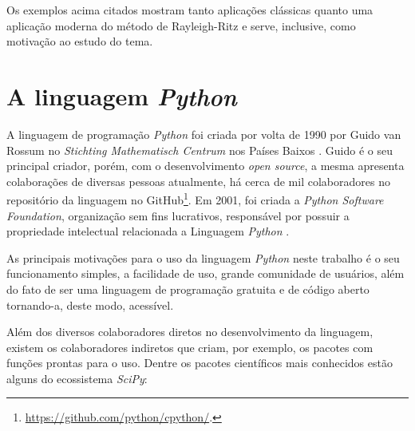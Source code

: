 \documentclass[
	12pt,				%
	openright,			%
    twoside,			%
	a4paper,			%
	chapter=TITLE,		%
	english,			%
	french,				%
	spanish,			%
	brazil				%
	]{abntex2}
\numberwithin{lema}{chapter}
\numberwithin{teorema}{chapter}
\numberwithin{definicao}{chapter}
\numberwithin{exemplo}{chapter}
\numberwithin{figure}{chapter}
\begin{document}
Os exemplos acima citados mostram tanto aplicações clássicas quanto uma aplicação moderna do método de Rayleigh-Ritz e serve, inclusive, como motivação ao estudo do tema.

\section{A linguagem \textit{Python}}

A linguagem de programação \textit{Python} foi criada por volta de 1990 por Guido van Rossum no \textit{Stichting Mathematisch Centrum} nos Países Baixos \cite{Python_history}. Guido é o seu principal criador, porém, com o desenvolvimento \textit{open source}, a mesma apresenta colaborações de diversas pessoas \textemdash\text{ }atualmente, há cerca de mil colaboradores no repositório da linguagem no GitHub\footnote{\url{https://github.com/python/cpython/}.}. Em 2001, foi criada a \textit{Python Software Foundation}, organização sem fins lucrativos, responsável por possuir a propriedade intelectual relacionada a Linguagem \textit{Python} \cite{Python_history}.

As principais motivações para o uso da linguagem \textit{Python} neste trabalho é o seu funcionamento simples, a facilidade de uso, grande comunidade de usuários, além do fato de ser uma linguagem de programação gratuita e de código aberto tornando-a, deste modo, acessível.

Além dos diversos colaboradores diretos no desenvolvimento da linguagem, existem os colaboradores indiretos que criam, por exemplo, os pacotes com funções prontas para o uso. Dentre os pacotes científicos mais conhecidos estão alguns do ecossistema \textit{SciPy}:
\end{document}
